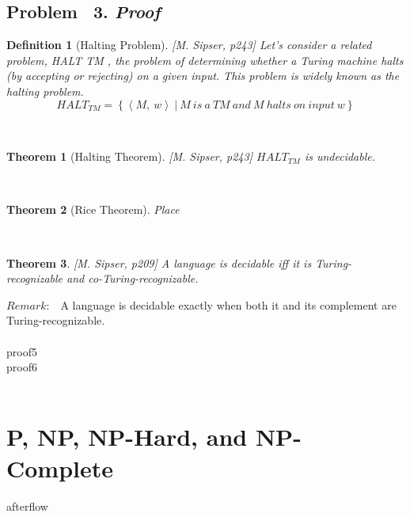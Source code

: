 \documentclass{article}
\theoremstyle{mydef}
\newtheorem{definition}{Definition}
\theoremstyle{mythm}
\newtheorem{theorem}{Theorem}
\theoremstyle{mylemming}
\theoremstyle{myq}
\begin{document}
\subsection{\small{Problem \ 3.} \normalsize\textit{Proof}}
\qthree
\proofthree
\newpage
 \begin{definition}[Halting Problem] \label{Sipser p243}[M. Sipser, p243]
  Let’s consider a related problem, HALT TM , the problem of determining whether a Turing machine halts (by accepting or rejecting) on a given input. This problem is widely known as the halting problem. 
\[ HALT_{TM}=\left\{ \left< M,\  w\right>  \  |\  M\  is\  a\  TM\  and\  M\  halts\  on\  input\  w\right\}  \]
\end{definition}
\\
\begin{theorem}[Halting Theorem] \label{Sipser p243}[M. Sipser, p243] \newline
$HALT_{TM}$ is undecidable.
 \end{theorem}
\\
 \begin{theorem}[Rice Theorem]
 Place
 \end{theorem}
\\
\begin{theorem} \label{Sipser p209}[M. Sipser, p209] \newline
A language is decidable iff it is Turing-recognizable and co-Turing-recognizable.
\end{theorem}
$Remark:$ \ A language is decidable exactly when both it and its complement are Turing-recognizable.
\\

 \qfour
 \\
{proof5}
\qfive
\\
{proof6}
\qsix
\proofsix
\\
\qseven
\\
\qeight


\section{P, NP, NP-Hard, and NP-Complete}

\afterthree


\newpage
{afterflow}
\end{document}
